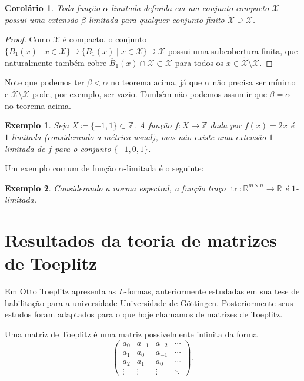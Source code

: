 \documentclass[a4paper,12pt]{article}
\DeclareMathOperator{\tr}{tr}
\newtheorem{corollary}{Corolário}
\newtheorem{example}{Exemplo}
\theoremstyle{definition}
\begin{document}
\begin{corollary} Toda função $\alpha$-limitada definida em um conjunto compacto $\mathcal{X}$ possui uma extensão $\beta$-limitada para qualquer conjunto finito $\tilde{\mathcal{X}} \supseteq \mathcal{X}$. \end{corollary}

\begin{proof} Como $\mathcal{X}$ é compacto, o conjunto $\{ \overline{B}_1(x) \mid x \in \mathcal{X} \} \supseteq \{ B_1(x) \mid x \in \mathcal{X} \} \supseteq \mathcal{X}$ possui uma subcobertura finita, que naturalmente também cobre $\overline{B}_1(x) \cap \mathcal{X} \subset \mathcal{X}$ para todos os $x \in \tilde{\mathcal{X}} \setminus \mathcal{X}$. \end{proof}

Note que podemos ter $\beta < \alpha$ no teorema acima, já que $\alpha$ não precisa ser mínimo e $\tilde{\mathcal{X}} \setminus \mathcal{X}$ pode, por exemplo, ser vazio. Também não podemos assumir que $\beta = \alpha$ no teorema acima.

\begin{example} Seja $X \coloneqq \{-1, 1\} \subset \mathbb{Z}$. A função $f : X \to \mathbb{Z}$ dada por $f(x) = 2x$ é $1$-limitada (considerando a métrica usual), mas não existe uma extensão $1$-limitada de $f$ para o conjunto $\{-1, 0, 1\}$. \end{example}

Um exemplo comum de função $\alpha$-limitada é o seguinte:

\begin{example} Considerando a norma espectral, a função traço $\tr : \mathbb{R}^{m \times n} \to \mathbb{R}$ é $1$-limitada. \end{example}

\newpage

\section{Resultados da teoria de matrizes de Toeplitz} \vspace{1cm}

Em \cite{Toeplitz1911} Otto Toeplitz apresenta as $L$-formas, anteriormente estudadas em sua tese de habilitação para a universidade Universidade de Göttingen. Posteriormente seus estudos foram adaptados para o que hoje chamamos de matrizes de Toeplitz.

Uma matriz de Toeplitz é uma matriz possivelmente infinita da forma \[ \begin{pmatrix} a_{0} & a_{-1} & a_{-2} & \cdots \\ a_{1} & a_{0} & a_{-1} & \cdots \\ a_2 & a_{1} & a_{0} & \cdots \\ \vdots & \vdots & \vdots & \ddots \end{pmatrix}\text{.} \]
\end{document}
